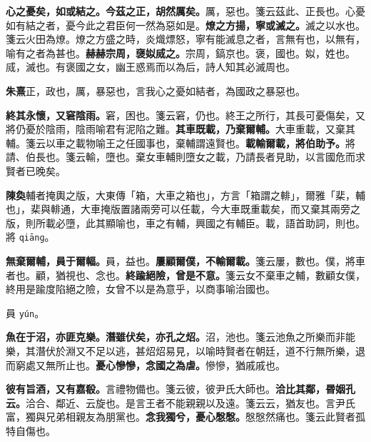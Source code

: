 \textbf{心之憂矣，如或結之。今茲之正，胡然厲矣。}{\footnotesize 厲，惡也。箋云茲此、正長也。心憂如有結之者，憂今此之君臣何一然為惡如是。}\textbf{燎之方揚，寧或滅之。}{\footnotesize 滅之以水也。箋云火田為燎。燎之方盛之時，炎熾熛怒，寧有能滅息之者，言無有也，以無有，喻有之者為甚也。}\textbf{赫赫宗周，襃姒烕之。}{\footnotesize 宗周，鎬京也。褒，國也。姒，姓也。烕，滅也。有褒國之女，幽王惑焉而以為后，詩人知其必滅周也。}

\begin{quoting}\textbf{朱熹}正，政也，厲，暴惡也，言我心之憂如結者，為國政之暴惡也。\end{quoting}

\textbf{終其永懷，又窘陰雨。}{\footnotesize 窘，困也。箋云窘，仍也。終王之所行，其長可憂傷矣，又將仍憂於陰雨，陰雨喻君有泥陷之難。}\textbf{其車既載，乃棄爾輔。}{\footnotesize 大車重載，又棄其輔。箋云以車之載物喻王之任國事也，棄輔謂遠賢也。}\textbf{載輸爾載，將伯助予。}{\footnotesize 將請、伯長也。箋云輸，墮也。棄女車輔則墮女之載，乃請長者見助，以言國危而求賢者已晚矣。}

\begin{quoting}\textbf{陳奐}輔者掩輿之版，大東傳「箱，大車之箱也」，方言「箱謂之輫」，爾雅「棐，輔也」，棐與輫通，大車掩版置諸兩旁可以任載，今大車既重載矣，而又棄其兩旁之版，則所載必墮，此其顯喻也，車之有輔，興國之有輔臣。載，語首助詞，則也。將 \texttt{qiānɡ}。\end{quoting}

\textbf{無棄爾輔，員于爾輻。}{\footnotesize 員，益也。}\textbf{屢顧爾僕，不輸爾載。}{\footnotesize 箋云屢，數也。僕，將車者也。顧，猶視也、念也。}\textbf{終踰絕險，曾是不意。}{\footnotesize 箋云女不棄車之輔，數顧女僕，終用是踰度陷絕之險，女曾不以是為意乎，以商事喻治國也。}

\begin{quoting}員 \texttt{yún}。\end{quoting}

\textbf{魚在于沼，亦匪克樂。潛雖伏矣，亦孔之炤。}{\footnotesize 沼，池也。箋云池魚之所樂而非能樂，其潛伏於淵又不足以逃，甚炤炤易見，以喻時賢者在朝廷，道不行無所樂，退而窮處又無所止也。}\textbf{憂心慘慘，念國之為虐。}{\footnotesize 慘慘，猶戚戚也。}

\textbf{彼有旨酒，又有嘉殽。}{\footnotesize 言禮物備也。箋云彼，彼尹氏大師也。}\textbf{洽比其鄰，昬姻孔云。}{\footnotesize 洽合、鄰近、云旋也。是言王者不能親親以及遠。箋云云，猶友也。言尹氏富，獨與兄弟相親友為朋黨也。}\textbf{念我獨兮，憂心慇慇。}{\footnotesize 慇慇然痛也。箋云此賢者孤特自傷也。}

